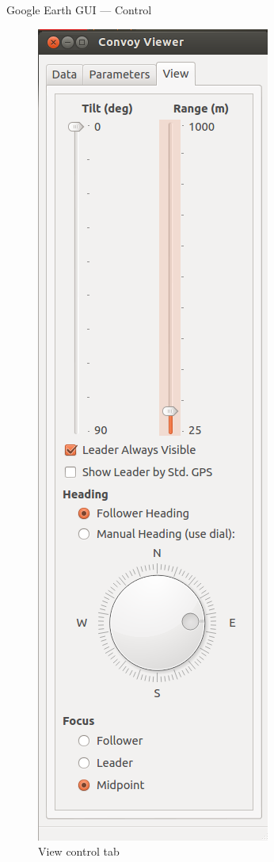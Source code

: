 \documentclass{beamer}
\begin{document}
\begin{frame}{Google Earth GUI --- Control}
\begin{figure}[!htb]
          \includegraphics[height=0.85\textheight]{../graphics/earth_view.png}
          \caption{\footnotesize View control tab}
        \endminipage
      \end{figure}
    \end{frame}
\end{document}
